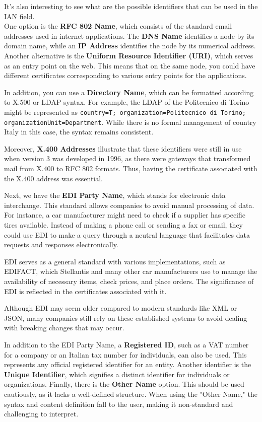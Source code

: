 It's also interesting to see what are the possible identifiers that 
can be used in the IAN field.\\
 One option is the \textbf{RFC 802 Name}, which consists 
of the standard email addresses used in internet applications. The 
\textbf{DNS Name} identifies a node by its domain name, while an 
\textbf{IP Address} identifies the node by its numerical address. 
Another alternative is the \textbf{Uniform Resource Identifier (URI)}, 
which serves as an entry point on the web. This means that on the 
same node, you could have different certificates corresponding to 
various entry points for the applications.

In addition, you can use a \textbf{Directory Name}, which can be 
formatted according to X.500 or LDAP syntax. For example, the 
LDAP of the Politecnico di Torino might be represented as 
\texttt{country=T; organization=Politecnico di Torino; organizationUnit=Department}. 
While there is no formal management of country Italy in this case, 
the syntax remains consistent. 

Moreover, \textbf{X.400 Addresses} illustrate that these identifiers 
were still in use when version 3 was developed in 1996, as there 
were gateways that transformed mail from X.400 to RFC 802 formats. 
Thus, having the certificate associated with the X.400 address 
was essential. 

Next, we have the \textbf{EDI Party Name}, which stands for 
electronic data interchange. This standard allows companies to 
avoid manual processing of data. For instance, a car manufacturer 
might need to check if a supplier has specific tires available. 
Instead of making a phone call or sending a fax or email, they 
could use EDI to make a query through a neutral language that 
facilitates data requests and responses electronically. 

EDI serves as a general standard with various implementations, such 
as EDIFACT, which Stellantis and many other car manufacturers use 
to manage the availability of necessary items, check prices, and 
place orders. The significance of EDI is reflected in the 
certificates associated with it. 

Although EDI may seem older compared to modern standards like XML or 
JSON, many companies still rely on these established systems to avoid
dealing with breaking changes that may occur.

In addition to the EDI Party Name, a \textbf{Registered ID}, 
such as a VAT number for a company or an Italian tax number for 
individuals, can also be used. This represents any official 
registered identifier for an entity. Another identifier is the 
\textbf{Unique Identifier}, which signifies a distinct identifier 
for individuals or organizations. Finally, there is the 
\textbf{Other Name} option. This should be used cautiously, as 
it lacks a well-defined structure. When using the "Other Name," 
the syntax and content definition fall to the user, making it 
non-standard and challenging to interpret.

